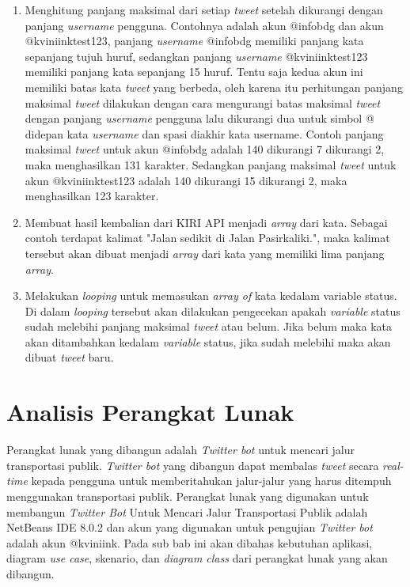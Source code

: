 \begin{enumerate}
	\item Menghitung panjang maksimal dari setiap \textit{tweet} setelah dikurangi dengan panjang \textit{username} pengguna. Contohnya adalah akun @infobdg dan akun @kviniinktest123,  panjang \textit{username} @infobdg memiliki panjang kata sepanjang tujuh huruf, sedangkan panjang \textit{username} @kviniinktest123 memiliki panjang kata sepanjang 15 huruf. Tentu saja kedua akun ini memiliki batas kata \textit{tweet} yang berbeda, oleh karena itu perhitungan panjang maksimal \textit{tweet} dilakukan dengan cara mengurangi batas maksimal \textit{tweet} dengan panjang \textit{username} pengguna lalu dikurangi dua untuk simbol @ didepan kata \textit{username} dan spasi diakhir kata username. Contoh panjang maksimal \textit{tweet} untuk akun @infobdg adalah 140 dikurangi 7 dikurangi 2, maka menghasilkan 131 karakter. Sedangkan panjang maksimal \textit{tweet} untuk akun @kviniinktest123 adalah 140 dikurangi 15 dikurangi 2, maka menghasilkan 123 karakter.
	\item Membuat hasil kembalian dari KIRI API menjadi \textit{array} dari kata. Sebagai contoh terdapat kalimat "Jalan sedikit di Jalan Pasirkaliki.", maka kalimat tersebut akan dibuat menjadi \textit{array} dari kata yang memiliki lima panjang \textit{array}.
	\item Melakukan \textit{looping} untuk memasukan \textit{array of} kata kedalam variable status. Di dalam \textit{looping} tersebut akan dilakukan pengecekan apakah \textit{variable} status sudah melebihi panjang maksimal \textit{tweet} atau belum. Jika belum maka kata akan ditambahkan kedalam \textit{variable} status, jika sudah melebihi maka akan dibuat \textit{tweet} baru.
\end{enumerate}

\section{Analisis Perangkat Lunak}

Perangkat lunak yang dibangun adalah \textit{Twitter bot} untuk mencari jalur transportasi publik. \textit{Twitter bot} yang dibangun dapat membalas \textit{tweet} secara \textit{real-time} kepada pengguna untuk memberitahukan jalur-jalur yang harus ditempuh menggunakan transportasi publik. Perangkat lunak yang digunakan untuk membangun \textit{Twitter Bot} Untuk Mencari Jalur Transportasi Publik adalah NetBeans IDE 8.0.2 dan akun yang digunakan untuk pengujian \textit{Twitter bot} adalah akun @kviniink. Pada sub bab ini akan dibahas kebutuhan aplikasi, diagram \textit{use case}, skenario, dan\textit{ diagram class} dari perangkat lunak yang akan dibangun.

